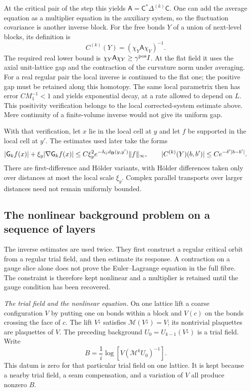 \documentclass[11pt,letterpaper,reqno]{amsart}
\theoremstyle{definition}
\theoremstyle{remark}
\begin{document}
At the critical pair of the step this yields
$\mathsf A=\mathsf C^*\Delta^{(k)}\mathsf C$.
One can add the average equation as a multiplier
equation in the auxiliary system, so the
fluctuation covariance is another inverse
block. For the free bonds $Y$ of a union of
next-level blocks, its definition is
\[
 C^{(k)}(Y)=(\chi_Y\mathsf A\chi_Y)^{-1}.
\]
The required real lower bound is
$\chi_Y\mathsf A\chi_Y\ge\gamma^{\rm pos}I$.
At the flat field it uses the axial unit-lattice
gap and the contraction of the curvature norm
under averaging. For a real regular pair the
local inverse is continued to the flat one;
the positive gap must be retained along this
homotopy. The same local parametrix then has
error $CM_1^{-1}<1$ and yields exponential
decay, at a rate allowed to depend on $L$.
This positivity verification belongs to the
local corrected-system estimate above. Mere
continuity of a finite-volume inverse would
not give its uniform gap.

With that verification, let $x$ lie in the local cell at $y$
and let $f$ be supported in the local cell at $y'$.
The estimates used later take the forms
\[
 |\mathsf G_kf(x)|+\xi_y|\nabla\mathsf G_kf(x)|
 \le C\xi_y^2e^{-\delta_{\rm G}d_{\mathbf B}(y,y')}
                                      \|f\|_\infty,
 \qquad
 |C^{(k)}(Y)(b,b')|\le Ce^{-\delta'|b-b'|}.
\]
There are first-difference and H\"older variants,
with H\"older differences taken only over
distances at most the local scale $\xi_y$.
Complex parallel transports over larger
distances need not remain uniformly bounded.

\subsection{The nonlinear background problem on a sequence of layers}

The inverse estimates are used twice. They first construct a
regular critical orbit from a regular trial field, and then
estimate its response. A contraction on a gauge slice alone
does not prove the Euler--Lagrange equation in the full fibre.
The constraint is therefore kept nonlinear and a multiplier
is retained until the gauge condition has been recovered.

\emph{The trial field and the nonlinear equation.}
On one lattice lift a coarse configuration $V$ by putting one
on bonds within a block and $V(c)$ on the bonds crossing the
face of $c$. The lift $V^\downarrow$ satisfies
$\mathcal M(V^\downarrow)=V$; its nontrivial plaquettes are
plaquettes of $V$. The preceding background
$U_0=U_{k-1}(V^\downarrow)$ is a trial field. Write
\[
 B=\frac1i\log[V(\mathcal M^kU_0)^{-1}].
\]
This datum is zero for that particular trial field on one
lattice. It is kept because a nearby trial field, a seam
compensation, and a variation of $V$ all produce nonzero
$B$.
\end{document}
